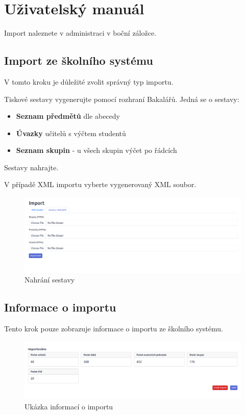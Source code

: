 %
%
%
%
%
%
% 
%

\chapter{Uživatelský manuál}

Import naleznete v administraci v boční záložce. 

\section{Import ze školního systému}
V tomto kroku je důležité zvolit správný typ importu.

Tiskové sestavy vygenerujte pomocí rozhraní Bakalářů. Jedná se o sestavy:
\begin{itemize}
    \item \textbf{Seznam předmětů} dle abecedy
    \item \textbf{Úvazky} učitelů s výčtem studentů
    \item \textbf{Seznam skupin} - u všech skupin výčet po řádcích
\end{itemize}
Sestavy nahrajte.

V případě XML importu vyberte vygenerovaný XML soubor.
\begin{figure}[H]
    \centering
    \includegraphics[width=1\linewidth]{Figures/uvodni_import.png}
    \caption{Nahrání sestavy}
    \label{fig:uvodni-import}
\end{figure}
\newpage
\section{Informace o importu}
Tento krok pouze zobrazuje informace o importu ze školního systému.
\begin{figure}[H]
    \centering
    \includegraphics[width=1\linewidth]{Figures/statistika.png}
    \caption{Ukázka informací o importu}
    \label{fig:informace}
\end{figure}

